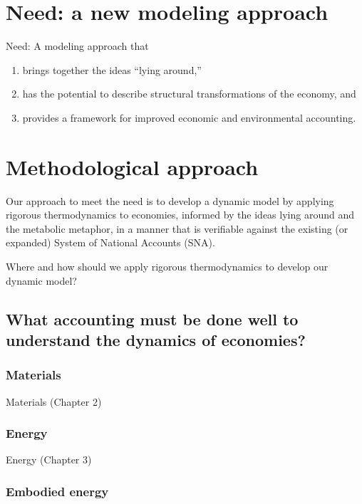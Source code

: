 \section{Need: a new modeling approach}
\label{sec:need}

Need: A modeling approach that
\begin{enumerate}
	\item brings together the ideas ``lying around,''
	\item has the potential to describe structural transformations of the economy, and 
	\item provides a framework for improved economic and environmental accounting.
\end{enumerate} 


\section{Methodological approach}
\label{sec:approach}

Our approach to meet the need is to develop a dynamic model by applying rigorous thermodynamics to economies, informed by the ideas lying around and the metabolic metaphor, in a manner that is verifiable against the existing (or expanded) System of National Accounts (SNA).

Where and how should we apply rigorous thermodynamics to develop our dynamic model? 

\subsection{What accounting must be done well to understand the dynamics of economies?}
\label{sec:structure}

\subsubsection{Materials}
\label{sec:materials}

Materials (Chapter 2)

\subsubsection{Energy}
\label{sec:energy}

Energy (Chapter 3)

\subsubsection{Embodied energy}
\label{sec:embodied_energy}

